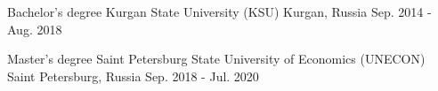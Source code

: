 

\begin{cventries}

  \cventry
    {Bachelor's degree} %
    {Kurgan State University (KSU)} %
    {Kurgan, Russia} %
    {Sep. 2014 - Aug. 2018} %
    {}

  \cventry
    {Master's degree} %
    {Saint Petersburg State University of Economics (UNECON)} %
    {Saint Petersburg, Russia} %
    {Sep. 2018 - Jul. 2020} %
    {}
\end{cventries}
